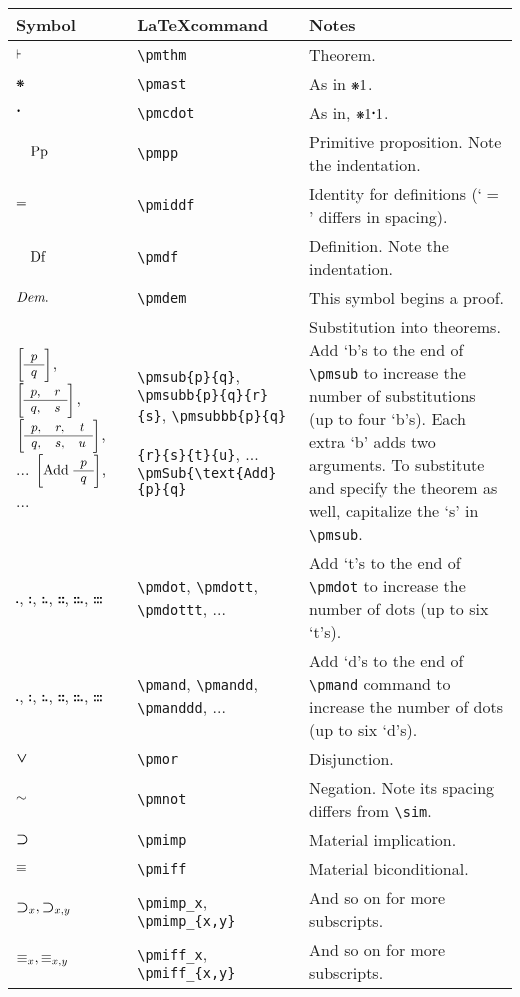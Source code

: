 \documentclass[12pt]{article}
\begin{document}
\noindent \begin{tabular}{@{}p{3cm} | p{5cm} | p{8.25cm}}
	\textbf{Symbol} & \textbf{\LaTeX command} & \textbf{Notes} \\ \hline
	$\pmthm$ & \verb|\pmthm| & Theorem. \\
	$\pmast$ & \verb|\pmast| & As in $\pmast1$.  \\ 
	$\pmcdot$ & \verb|\pmcdot| & As in, $\pmast1\pmcdot1$. \\
	$\pmpp$ & \verb|\pmpp| & Primitive proposition. Note the indentation. \\
	$\pmiddf$ & \verb|\pmiddf| & Identity for definitions (`$=$' differs in spacing).  \\
	$\pmdf$ & \verb|\pmdf| & Definition. Note the indentation.  \\
	$\pmdem$ & \verb|\pmdem| & This symbol begins a proof. \\  
	$\pmsub{p}{q}$, $\pmsubb{p}{q}{r}{s}$, $\pmsubbb{p}{q}{r}{s}{t}{u}$, ... $\pmSub{\text{Add}}{p}{q}$, ... & \verb|\pmsub{p}{q}|, \verb|\pmsubb{p}{q}{r}{s}|, \verb|\pmsubbb{p}{q}| \par \hfill \verb|{r}{s}{t}{u}|, ... \verb|\pmSub{\text{Add}{p}{q}| & Substitution into theorems. Add `b's to the end of \verb|\pmsub| to increase the number of substitutions (up to four `b's). Each extra `b' adds two arguments. To substitute and specify the theorem as well, capitalize the `s' in \verb|\pmsub|. \\
	$\pmdot$, $\pmdott$, $\pmdottt$, $\pmdotttt$, $\pmdottttt$, $\pmdotttttt$ & \verb|\pmdot|, \verb|\pmdott|, \verb|\pmdottt|, ... & Add `t's to the end of \verb|\pmdot| to increase the number of dots (up to six `t's). \\ 
	$\pmand$, $\pmandd$, $\pmanddd$, $\pmandddd$, $\pmanddddd$, $\pmandddddd$ & \verb|\pmand|, \verb|\pmandd|, \verb|\pmanddd|, ...& Add `d's to the end of \verb|\pmand| command to increase the number of dots (up to six `d's). \\ 
	$\pmor$ & \verb|\pmor| & Disjunction. \\
	$\pmnot$ & \verb|\pmnot| & Negation. Note its spacing differs from \verb|\sim|. \\
	$\pmimp$ & \verb|\pmimp| & Material implication. \\
	$\pmiff$ & \verb|\pmiff| & Material biconditional. \\
	$\pmimp_x, \pmimp_{x,y}$ & \verb|\pmimp_x|, \verb|\pmimp_{x,y}| & And so on for more subscripts. \\
	$\pmiff_x, \pmiff_{x,y}$ & \verb|\pmiff_x|, \verb|\pmiff_{x,y}| & And so on for more subscripts. \\

\end{tabular}
\end{document}
